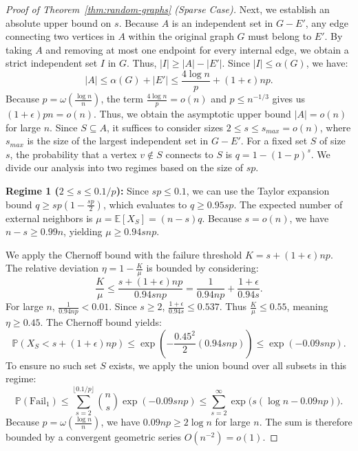 \documentclass[12pt,UKenglish]{amsart}
\theoremstyle{plain}
\theoremstyle{definition}
\theoremstyle{remark}
\begin{document}
\begin{proof}[Proof of Theorem~\ref{thm:random-graphs} (Sparse Case)]
Next, we establish an absolute upper bound on $s$. Because $A$ is an independent set in $G - E'$, any edge connecting two vertices in $A$ within the original graph $G$ must belong to $E'$. By taking $A$ and removing at most one endpoint for every internal edge, we obtain a strict independent set $I$ in $G$. Thus, $|I| \ge |A| - |E'|$. Since $|I| \le \alpha(G)$, we have:
\begin{equation*}
  |A| \le \alpha(G) + |E'| \le \frac{4 \log n}{p} + (1+\epsilon)np.
\end{equation*}
Because $p = \omega\left(\frac{\log n}{n}\right)$, the term $\frac{4\log n}{p} = o(n)$ and $p\le n^{-1/3}$ gives us $(1+\epsilon)pn=o(n)$. Thus, we obtain the asymptotic upper bound $|A|= o(n)$ for large $n$. Since $S \subseteq A$, it suffices to consider sizes $2 \le s \le s_{max}=o(n)$, where $s_{max}$ is the size of the largest independent set in $G-E'$.
For a fixed set $S$ of size $s$, the probability that a vertex $v \notin S$ connects to $S$ is $q = 1 - (1-p)^s$. We divide our analysis into two regimes based on the size of $sp$.

\textbf{Regime 1 ($2 \le s \le 0.1/p$):} Since $sp \le 0.1$, we can use the Taylor expansion bound $q \ge sp(1 - \frac{sp}{2})$, which evaluates to $q \ge 0.95sp$. The expected number of external neighbors is $\mu = \mathbb{E}[X_S] = (n-s)q$. Because $s= o(n)$, we have $n-s \ge 0.99n$, yielding $\mu \ge 0.94snp$. 

We apply the Chernoff bound with the failure threshold $K = s + (1+\epsilon)np$. The relative deviation $\eta = 1 - \frac{K}{\mu}$ is bounded by considering:
\begin{equation*}
  \frac{K}{\mu} \le \frac{s + (1+\epsilon)np}{0.94 snp} = \frac{1}{0.94np} + \frac{1+\epsilon}{0.94s}.
\end{equation*}
For large $n$, $\frac{1}{0.94np} < 0.01$. Since $s \ge 2$, $\frac{1+\epsilon}{0.94s} \le 0.537$. Thus $\frac{K}{\mu} \le 0.55$, meaning $\eta \ge 0.45$. The Chernoff bound yields:
\begin{equation*}
  \mathbb{P}(X_S < s + (1+\epsilon)np) \le \exp\left(-\frac{0.45^2}{2}(0.94snp)\right) \le \exp(-0.09 snp).
\end{equation*}
To ensure no such set $S$ exists, we apply the union bound over all subsets in this regime:
\begin{equation*}
  \mathbb{P}(\text{Fail}_1) \le \sum_{s=2}^{\lfloor 0.1/p \rfloor} \binom{n}{s} \exp(-0.09 snp) \le \sum_{s=2}^{\infty} \exp\Big(s (\log n - 0.09 np)\Big).
\end{equation*}
Because $p = \omega\left(\frac{\log n}{n}\right)$, we have $0.09np \ge 2 \log n$ for large $n$. The sum is therefore bounded by a convergent geometric series $O(n^{-2}) = o(1)$.


\end{proof}
\end{document}
